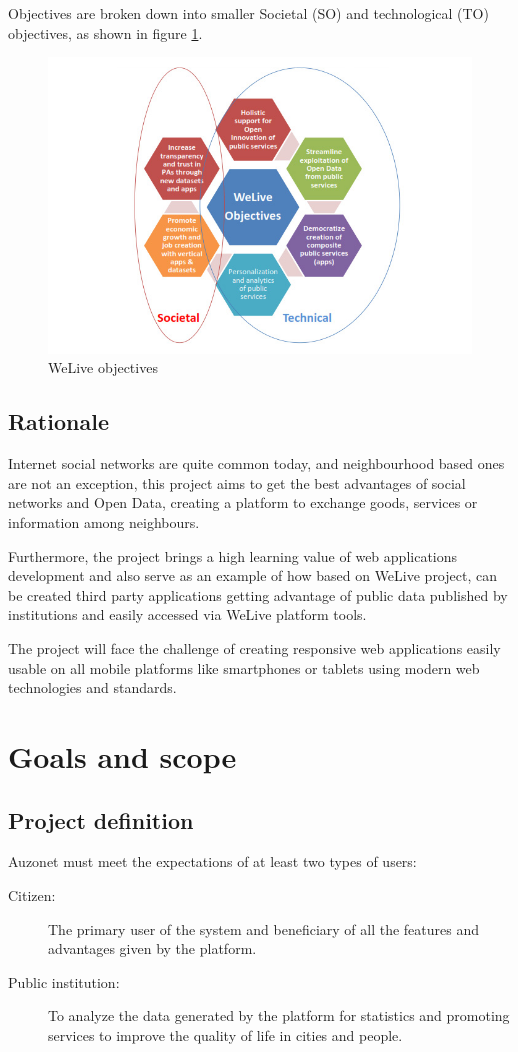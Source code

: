 \documentclass{DeustoFDP}
\begin{document}
Objectives are broken down into smaller Societal (SO) and technological (TO) objectives, as shown in figure \ref{fig:welive3}.
\begin{figure}[h!]
\centering
\includegraphics[width=0.7\linewidth]{fig/welive3}
\caption[WeLive objectives]{WeLive objectives}
\label{fig:welive3}
\end{figure}


\section{Rationale}
Internet social networks are quite common today, and neighbourhood based ones are not an exception, this project aims to get the best advantages of social networks and Open Data, creating a platform to exchange goods, services or information among neighbours.

Furthermore, the project brings a high learning value of web applications development and also serve as an example of how based on WeLive project, can be created third party applications getting advantage of public data published by institutions and easily accessed via WeLive platform tools.

The project will face the challenge of creating responsive web applications easily usable on all mobile platforms like smartphones or tablets using modern web technologies and standards. 
\chapter{Goals and scope}\label{cha:goalsandscope}
\section{Project definition}
Auzonet must meet the expectations of at least two types of users:
\begin{description}
	\item[Citizen:] The primary user of the system and beneficiary of all the features and advantages given by the platform.
	\item[Public institution:] To analyze the data generated by the platform for statistics and promoting services to improve the quality of life in cities and people.
\end{description}
\end{document}
